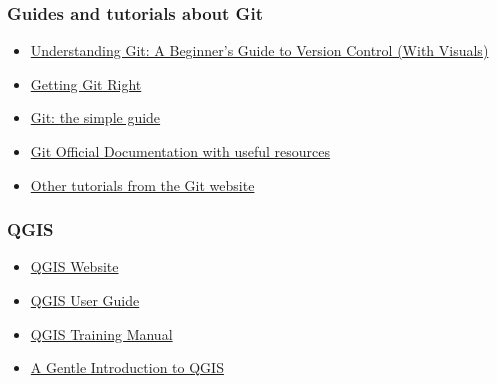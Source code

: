 \documentclass[
  letterpaper,
  DIV=11,
  numbers=noendperiod]{scrartcl}
\begin{document}
\subsubsection{Guides and tutorials about
Git}\label{guides-and-tutorials-about-git}

\begin{itemize}
\item
  \href{https://dev.to/jitendrachoudhary/understanding-git-a-beginners-guide-to-version-control-with-visuals-5cbf}{Understanding
  Git: A Beginner's Guide to Version Control (With Visuals)}
\item
  \href{https://www.atlassian.com/git}{Getting Git Right}
\item
  \href{https://rogerdudler.github.io/git-guide/index.html}{Git: the
  simple guide}
\item
  \href{https://git-scm.com/doc}{Git Official Documentation with useful
  resources}
\item
  \href{https://git-scm.com/doc/ext}{Other tutorials from the Git
  website}
\end{itemize}

\subsubsection{QGIS}\label{qgis}

\begin{itemize}
\item
  \href{https://qgis.org}{QGIS Website}
\item
  \href{https://docs.qgis.org/latest/en/docs/user_manual/}{QGIS User
  Guide}
\item
  \href{https://docs.qgis.org/3.34/en/docs/training_manual/}{QGIS
  Training Manual}
\item
  \href{https://docs.qgis.org/3.34/en/docs/gentle_gis_introduction/}{A
  Gentle Introduction to QGIS}
\end{itemize}
\end{document}
